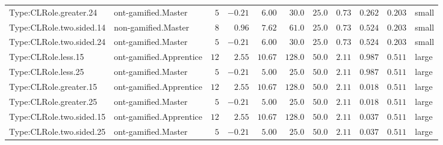 \documentclass[6pt,a4paper]{article}
\begin{document}
{\begin{longtable}{llrrrrrrrrl}
Type:CLRole.greater.24&ont-gamified.Master&$ 5$&$-0.21$&$ 6.00$&$ 30.0$&$ 25.0$&$ 0.73$&$0.262$&$0.203$&small\tabularnewline
Type:CLRole.two.sided.14&non-gamified.Master&$ 8$&$ 0.96$&$ 7.62$&$ 61.0$&$ 25.0$&$ 0.73$&$0.524$&$0.203$&small\tabularnewline
Type:CLRole.two.sided.24&ont-gamified.Master&$ 5$&$-0.21$&$ 6.00$&$ 30.0$&$ 25.0$&$ 0.73$&$0.524$&$0.203$&small\tabularnewline
Type:CLRole.less.15&ont-gamified.Apprentice&$12$&$ 2.55$&$10.67$&$128.0$&$ 50.0$&$ 2.11$&$0.987$&$0.511$&large\tabularnewline
Type:CLRole.less.25&ont-gamified.Master&$ 5$&$-0.21$&$ 5.00$&$ 25.0$&$ 50.0$&$ 2.11$&$0.987$&$0.511$&large\tabularnewline
Type:CLRole.greater.15&ont-gamified.Apprentice&$12$&$ 2.55$&$10.67$&$128.0$&$ 50.0$&$ 2.11$&$0.018$&$0.511$&large\tabularnewline
Type:CLRole.greater.25&ont-gamified.Master&$ 5$&$-0.21$&$ 5.00$&$ 25.0$&$ 50.0$&$ 2.11$&$0.018$&$0.511$&large\tabularnewline
\newpage
Type:CLRole.two.sided.15&ont-gamified.Apprentice&$12$&$ 2.55$&$10.67$&$128.0$&$ 50.0$&$ 2.11$&$0.037$&$0.511$&large\tabularnewline
Type:CLRole.two.sided.25&ont-gamified.Master&$ 5$&$-0.21$&$ 5.00$&$ 25.0$&$ 50.0$&$ 2.11$&$0.037$&$0.511$&large\tabularnewline
\hline
\end{longtable}}
\end{document}
